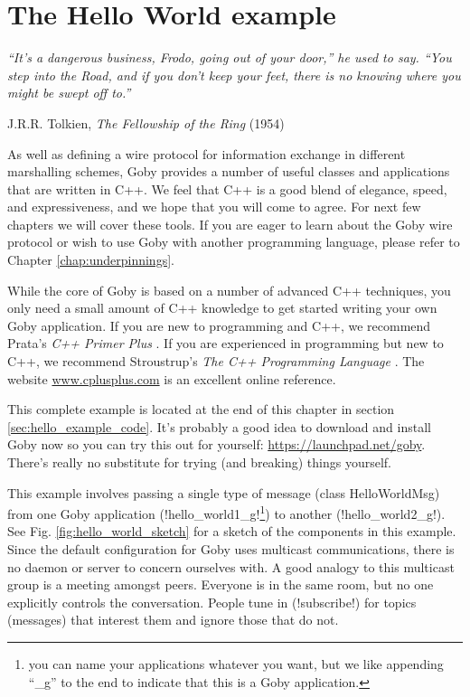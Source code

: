 \chapter{The Hello World example}
\epigraph{\textit{``It's a dangerous business, Frodo, going out of your door,'' he used to say. ``You step into the Road, and if you don't keep your feet, there is no knowing where you might be swept off to.''}}{J.R.R. Tolkien, \textit{The Fellowship of the Ring} (1954)}



\MakeShortVerb{\!} %

As well as defining a wire protocol for information exchange in different marshalling schemes, Goby provides a number of useful classes and applications that are written in C++.  We feel that C++ is a good blend of elegance, speed, and expressiveness, and we hope that you will come to agree. For next few chapters we will cover these tools. If you are eager to learn about the Goby wire protocol or wish to use Goby with another programming language, please refer to Chapter \ref{chap:underpinnings}.

While the core of Goby is based on a number of advanced C++ techniques, you only need a small amount of C++ knowledge to get started writing your own Goby application. If you are new to programming and C++, we recommend Prata's \textit{C++ Primer Plus} \cite{Prata:2001:CPP:515923}. If you are experienced in programming but new to C++, we recommend Stroustrup's \textit{The C++ Programming Language} \cite{Stroustrup:2000:CPL:518791}. The website \url{www.cplusplus.com} is an excellent online reference.

This complete example is located at the end of this chapter in section \ref{sec:hello_example_code}. It's probably a good idea to download and install Goby now so you can try this out for yourself: \url{https://launchpad.net/goby}. There's really no substitute for trying (and breaking) things yourself.

This example involves passing a single type of message (class HelloWorldMsg) from one Goby application (!hello_world1_g!\footnote{you can name your applications whatever you want, but we like appending ``\_g'' to the end to indicate that this is a Goby application.}) to another (!hello_world2_g!).  See Fig. \ref{fig:hello_world_sketch} for a sketch of the components in this example. Since the default configuration for Goby uses \gls{multicast} communications, there is no \gls{daemon} or server to concern ourselves with. A good analogy to this multicast group is a meeting amongst peers. Everyone is in the same room, but no one explicitly controls the conversation. People tune in (!subscribe!) for topics (messages) that interest them and ignore those that do not.

